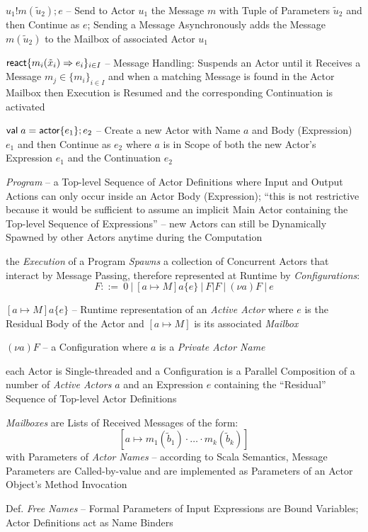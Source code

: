 $u_1 ! m(\tilde{u}_2) ; e$ -- Send to Actor $u_1$ the Message $m$ with
Tuple of Parameters $\tilde{u}_2$ and then Continue as $e$;
Sending a Message Asynchronously adds the Message $m(\tilde{u}_2)$ to
the Mailbox of associated Actor $u_1$

$\mathsf{react}\{ m_i(\tilde{x}_i) \Rightarrow e_i \}_{i \in I}$ -- Message
Handling: Suspends an Actor until it Receives a Message $m_j \in \{
m_i \}_{i \in I}$ and when a matching Message is found in the Actor
Mailbox then Execution is Resumed and the corresponding Continuation
is activated

$\mathsf{val\;} a = \mathsf{actor}\{e_1\};e_2$ -- Create a new Actor with Name $a$ and
Body (Expression) $e_1$ and then Continue as $e_2$ where $a$ is in
Scope of both the new Actor's Expression $e_1$ and the Continuation
$e_2$

\emph{Program} -- a Top-level Sequence of Actor Definitions where
Input and Output Actions can only occur inside an Actor Body
(Expression); ``this is not restrictive because it would be sufficient
to assume an implicit Main Actor containing the Top-level Sequence of
Expressions'' %
-- new Actors can still be Dynamically Spawned by other Actors anytime
during the Computation

the \emph{Execution} of a Program \emph{Spawns} a collection of
Concurrent Actors that interact by Message Passing, therefore
represented at Runtime by \emph{Configurations}:
\[
  F ::=\ 0 \ |\ [a \mapsto M] a \{e\} \ |\ F|F \ |\ (\nu a)F \ |\ e
\]

$[a \mapsto M]a\{e\}$ -- Runtime representation of an \emph{Active
  Actor} where $e$ is the Residual Body of the Actor and $[a \mapsto
  M]$ is its associated \emph{Mailbox}

$(\nu a)F$ -- a Configuration where $a$ is a \emph{Private Actor Name}

each Actor is Single-threaded and a Configuration is a Parallel
Composition of a number of \emph{Active Actors} $a$ and an Expression
$e$ containing the ``Residual'' Sequence of Top-level Actor
Definitions

\emph{Mailboxes} are Lists of Received Messages of the form:
\[
  [a \mapsto m_1(\tilde{b}_1) \cdot\ldots\cdot m_k(\tilde{b}_k)]
\]
with Parameters of \emph{Actor Names} -- according to Scala Semantics,
Message Parameters are Called-by-value and are implemented as
Parameters of an Actor Object's Method Invocation %

Def. \emph{Free Names} -- Formal Parameters of Input Expressions are
Bound Variables; Actor Definitions act as Name Binders

